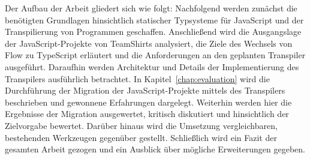 Der Aufbau der Arbeit gliedert sich wie folgt: Nachfolgend werden zunächst die benötigten Grundlagen hinsichtlich statischer Typsysteme für JavaScript und der Transpilierung von Programmen geschaffen. Anschließend wird die Ausgangslage der JavaScript-Projekte von TeamShirts analysiert, die Ziele des Wechsels von Flow zu TypeScript erläutert und die Anforderungen an den geplanten Transpiler ausgeführt. Daraufhin werden Architektur und Details der Implementierung des Transpilers ausführlich betrachtet. In Kapitel~\ref{chap:evaluation} wird die Durchführung der Migration der JavaScript-Projekte mittels des Transpilers beschrieben und gewonnene Erfahrungen dargelegt. Weiterhin werden hier die Ergebnisse der Migration ausgewertet, kritisch diskutiert und hinsichtlich der Zielvorgabe bewertet. Darüber hinaus wird die Umsetzung vergleichbaren, bestehenden Werkzeugen gegenüber gestellt. Schließlich wird ein Fazit der gesamten Arbeit gezogen und ein Ausblick über mögliche Erweiterungen gegeben.
